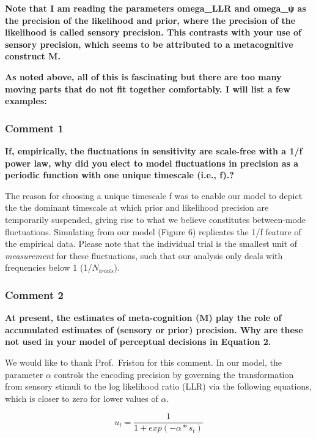 \documentclass[
]{article}
\begin{document}
\textbf{Note that I am reading the parameters omega\_LLR and omega\_ψ as
the precision of the likelihood and prior, where the precision of the
likelihood is called sensory precision. This contrasts with your use of
sensory precision, which seems to be attributed to a metacognitive
construct M.}

\textbf{As noted above, all of this is fascinating but there are too
many moving parts that do not fit together comfortably. I will list a
few examples:}

\hypertarget{comment-1}{%
\subsubsection{Comment 1}\label{comment-1}}

\textbf{If, empirically, the fluctuations in sensitivity are scale-free
with a 1/f power law, why did you elect to model fluctuations in
precision as a periodic function with one unique timescale (i.e., f).?}

The reason for choosing a unique timescale f was to enable our model to
depict the the dominant timescale at which prior and likelihood
precision are temporarily suspended, giving rise to what we believe
constitutes between-mode fluctuations. Simulating from our model (Figure
6) replicates the 1/f feature of the empirical data. Please note that
the individual trial is the smallest unit of \emph{measurement} for
these fluctuations, such that our analysis only deals with frequencies
below 1 (1/\(N_{trials}\)).

\hypertarget{comment-2}{%
\subsubsection{Comment 2}\label{comment-2}}

\textbf{At present, the estimates of meta-cognition (M) play the role of
accumulated estimates of (sensory or prior) precision. Why are these not
used in your model of perceptual decisions in Equation 2.}

We would like to thank Prof.~Friston for this comment. In our model, the
parameter \(\alpha\) controls the encoding precision by governing the
transformation from sensory stimuli to the log likelihood ratio (LLR)
via the following equations, which is closer to zero for lower values of
\(\alpha\).

\begin{equation}
u_t = \frac{1}{1 + exp(-\alpha * s_t)}
\end{equation}
\end{document}
